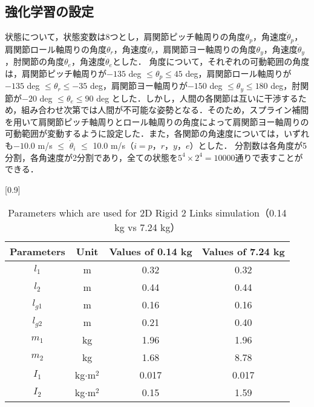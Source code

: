 \subsection{強化学習の設定}
状態について，状態変数は8つとし，肩関節ピッチ軸周りの角度$\theta_{p}$，角速度$\dot{\theta}_{p}$，肩関節ロール軸周りの角度$\theta_{r}$，角速度$\dot{\theta}_{r}$，肩関節ヨー軸周りの角度$\theta_{y}$，角速度$\dot{\theta}_{y}$，肘関節の角度$\theta_{e}$，角速度$\dot{\theta}_{e}$とした．
角度について，それぞれの可動範囲の角度は，肩関節ピッチ軸周りが$-135$ deg $\leq\theta_{p}\leq45$  deg，肩関節ロール軸周りが$-135$ deg $\leq\theta_{r}\leq-35$ deg，肩関節ヨー軸周りが$-150$ deg $\leq\theta_{y}\leq180$ deg，肘関節が$-20$ deg $\leq\theta_{e}\leq90$ deg とした．しかし，人間の各関節は互いに干渉するため，組み合わせ次第では人間が不可能な姿勢となる．そのため，スプライン補間\cite{spline}を用いて肩関節ピッチ軸周りとロール軸周りの角度によって肩関節ヨー軸周りの可動範囲が変動するように設定した．また，各関節の角速度については，いずれも$-10.0$ m/s $\le$ $\dot{\theta}_{i}$ $\le$ 10.0 m/s（$i = p，r，y，e$）とした．
分割数は各角度が5分割，各角速度が2分割であり，全ての状態を$5^{4}\times 2^{4}=10000$通りで表すことができる．\\
\begin{table}[t]
  \begin{center}
    \caption{Parameters which are used for 2D Rigid 2 Links simulation（0.14 kg vs 7.24 kg）}
    \scalebox{0.9}[0.9]{
    \begin{tabular}{c|c|c|c}
      \hline
      Parameters & Unit & Values of 0.14 kg & Values of 7.24 kg \\
      \hline
      $l_{1}$ & m & 0.32 & 0.32\\
      $l_{2}$ & m & 0.44 & 0.44\\
      $l_{g1}$ & m & 0.16 & 0.16 \\
      $l_{g2}$ & m & 0.21 & 0.40 \\
      $m_{1}$ & kg & 1.96 & 1.96\\
      $m_{2}$ & kg & 1.68 & 8.78 \\
      $I_{1}$ & kg$\cdot$$\mathrm{m}^2$ & 0.017 & 0.017 \\
      $I_{2}$ & kg$\cdot$$\mathrm{m}^2$ & 0.15 & 1.59 \\
      \hline
    \end{tabular}
    }
  \end{center}
\end{table}
